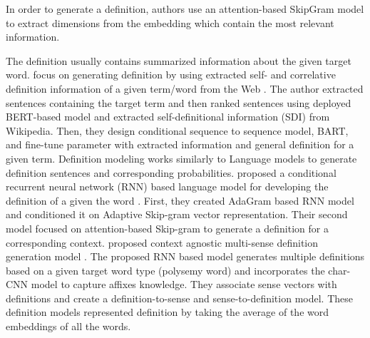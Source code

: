 In order to generate a definition, authors use an attention-based SkipGram model to
extract dimensions from the embedding which contain the most relevant
information.




The definition usually contains summarized information about the given target word. \citeauthor*{huang_cdm_2021} focus on generating definition by using extracted self- and correlative definition information of a given term/word from the Web \cite{huang_cdm_2021}. The author extracted sentences containing the target term and then ranked sentences using deployed BERT-based model and extracted self-definitional information (SDI) from Wikipedia. Then, they design conditional sequence to sequence model, BART, and fine-tune parameter with extracted information and general definition for a given term. Definition modeling works similarly to Language models to generate definition sentences and corresponding probabilities. \citeauthor*{gadetsky_conditional_2018} proposed a conditional recurrent neural network (RNN) based language model for developing the definition of a given the word \cite{gadetsky_conditional_2018}. First, they created AdaGram based RNN model and conditioned it on Adaptive Skip-gram vector representation. Their second model focused on attention-based Skip-gram to generate a definition for a corresponding context. \citeauthor*{sojka_evaluating_2020} proposed context agnostic multi-sense definition generation model \cite{sojka_evaluating_2020}. The proposed RNN based model generates multiple definitions based on a given target word type (polysemy word) and incorporates the char-CNN model to capture affixes knowledge. They associate sense vectors with definitions and create a definition-to-sense and sense-to-definition model. These definition models represented definition by taking the average of the word embeddings of all the words.

